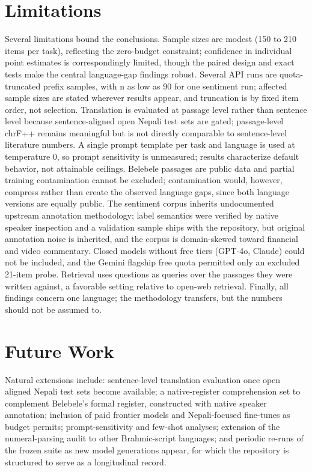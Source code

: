 \documentclass[conference]{IEEEtran}
\begin{document}
\section{Limitations}
Several limitations bound the conclusions. Sample sizes are modest (150 to 210 items per task), reflecting the zero-budget constraint; confidence in individual point estimates is correspondingly limited, though the paired design and exact tests make the central language-gap findings robust. Several API runs are quota-truncated prefix samples, with n as low as 90 for one sentiment run; affected sample sizes are stated wherever results appear, and truncation is by fixed item order, not selection. Translation is evaluated at passage level rather than sentence level because sentence-aligned open Nepali test sets are gated; passage-level chrF++ remains meaningful but is not directly comparable to sentence-level literature numbers. A single prompt template per task and language is used at temperature 0, so prompt sensitivity is unmeasured; results characterize default behavior, not attainable ceilings. Belebele passages are public data and partial training contamination cannot be excluded; contamination would, however, compress rather than create the observed language gaps, since both language versions are equally public. The sentiment corpus inherits undocumented upstream annotation methodology; label semantics were verified by native speaker inspection and a validation sample ships with the repository, but original annotation noise is inherited, and the corpus is domain-skewed toward financial and video commentary. Closed models without free tiers (GPT-4o, Claude) could not be included, and the Gemini flagship free quota permitted only an excluded 21-item probe. Retrieval uses questions as queries over the passages they were written against, a favorable setting relative to open-web retrieval. Finally, all findings concern one language; the methodology transfers, but the numbers should not be assumed to.

\section{Future Work}
Natural extensions include: sentence-level translation evaluation once open aligned Nepali test sets become available; a native-register comprehension set to complement Belebele's formal register, constructed with native speaker annotation; inclusion of paid frontier models and Nepali-focused fine-tunes as budget permits; prompt-sensitivity and few-shot analyses; extension of the numeral-parsing audit to other Brahmic-script languages; and periodic re-runs of the frozen suite as new model generations appear, for which the repository is structured to serve as a longitudinal record.
\end{document}
